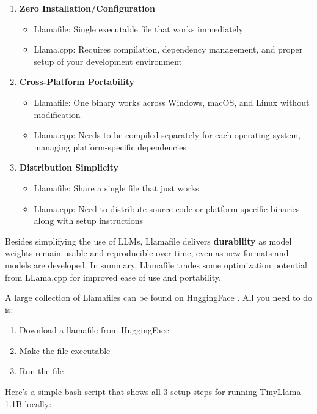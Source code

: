 \begin{enumerate}
\item \textbf{Zero Installation/Configuration}
\begin{itemize}
\item Llamafile: Single executable file that works immediately
\item Llama.cpp: Requires compilation, dependency management, and proper setup of your development environment
\end{itemize}

\item \textbf{Cross-Platform Portability}
\begin{itemize}
\item Llamafile: One binary works across Windows, macOS, and Linux without modification
\item Llama.cpp: Needs to be compiled separately for each operating system, managing platform-specific dependencies
\end{itemize}

\item \textbf{Distribution Simplicity}
\begin{itemize}
\item Llamafile: Share a single file that just works
\item Llama.cpp: Need to distribute source code or platform-specific binaries along with setup instructions
\end{itemize}
\end{enumerate}

Besides simplifying the use of LLMs, Llamafile delivers \textbf{durability} as model weights remain usable and reproducible over time, even as new formats and models are developed. In summary, Llamafile trades some optimization potential from LLama.cpp for improved ease of use and portability.

A large collection of Llamafiles can be found on HuggingFace . All you need to do is:

\begin{enumerate}
\item Download a llamafile from HuggingFace
\item Make the file executable
\item Run the file
\end{enumerate}

Here's a simple bash script that shows all 3 setup steps for running TinyLlama-1.1B locally:

